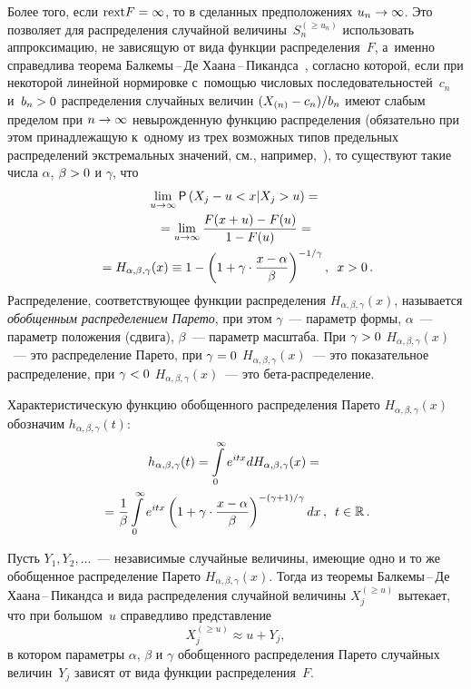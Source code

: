 \begin{multicols}{2}
Более того, если $\mathrm{rext}F\hm=\infty$, то в сделанных
предположениях $u_n\hm\to\infty$. Это позволяет для распределения
случайной величины~$S_n^{(\ge u_n)}$ использовать аппроксимацию, не зависящую 
от вида функции распределения~$F$, а~именно справедлива
\mbox{теорема} Бал\-ке\-мы\,--\,Де Ха\-ана\,--\,Пи\-канд\-са~\cite{BalkemaDeHaan1974, Pickands1975}, 
согласно которой, если при
некоторой линейной нормировке с~по\-мощью числовых последовательностей~$c_n$ 
и~$b_n\hm>0$ распределения случайных величин $(X_{(n)}\hm-c_n)/b_n$
имеют слабым пределом при $n\hm\to\infty$ невырожденную функцию
распределения (обязательно при этом принадлежащую к~одному из
трех возможных типов предельных распределений экстремальных
значений, см., например,~\cite{Galambos1978}), то существуют такие
числа $\alpha$, $\beta\hm>0$ и $\gamma$, что
\begin{multline*}
\lim\limits_{u\to\infty}{\sf P}
\left(X_j-u<x|X_j>u\right)={}\\
{}=
\lim\limits_{u\to\infty}\displaystyle\frac{\displaystyle F(x+u)-F(u)\mathstrut}{\displaystyle 1-F(u)\mathstrut}=
{}\\
{}
=H_{\alpha,\beta,\gamma}(x)\equiv
1-\left(1+\gamma\cdot\displaystyle\frac{\displaystyle x-\alpha\mathstrut}{\displaystyle \beta\mathstrut}\right)^{-1/\gamma},\enskip
x>0\,.
\end{multline*}
Распределение, соответствующее функции распределения
$H_{\alpha,\beta,\gamma}(x)$, называется \textit{обобщенным
распределением Парето}, при этом $\gamma$~--- параметр формы,
$\alpha$~--- параметр положения (сдвига), $\beta$~--- параметр
масштаба. При $\gamma\hm>0$ $H_{\alpha,\beta,\gamma}(x)$~--- это
распределение Парето, при $\gamma\hm=0$ $H_{\alpha,\beta,\gamma}(x)$~---
это показательное распределение, при $\gamma\hm<0$
$H_{\alpha,\beta,\gamma}(x)$~--- это бе\-та-рас\-пре\-де\-ление.

Характеристическую функцию обобщенного распределения Парето
$H_{\alpha,\beta,\gamma}(x)$ обозначим $h_{\alpha,\beta,\gamma}(t)$:
\begin{multline*}
h_{\alpha,\beta,\gamma}(t)=\int\limits_{0}^{\infty}e^{itx}dH_{\alpha,\beta,\gamma}(x)={}\\
{}=
\displaystyle\frac{\displaystyle 1\mathstrut}{\displaystyle \beta\mathstrut}\int\limits_{0}^{\infty}e^{itx}
\left(1+\gamma\cdot\displaystyle\frac{\displaystyle x-\alpha\mathstrut}{\displaystyle \beta\mathstrut}\right)^{-
(\gamma+1)/\gamma}dx\,,\enskip
t\in\mathbb{R}\,.
\end{multline*}

Пусть $Y_1,Y_2,\ldots$~--- независимые случайные величины, имеющие
одно и то же обобщенное распределение Парето
$H_{\alpha,\beta,\gamma}(x)$. Тогда из теоремы Бал\-ке\-мы\,--\,Де
Ха\-ана\,--\,Пи\-канд\-са и вида распределения случайной величины $X_j^{(\ge u)}$ 
вытекает, что при большом~$u$ справедливо представление
$$
X_j^{(\ge u)}\approx u+Y_j,
$$
в котором параметры $\alpha$, $\beta$ и $\gamma$ обобщенного
распределения Парето случайных величин~$Y_j$ зависят от вида функции
распределения~$F$.


\end{multicols}
